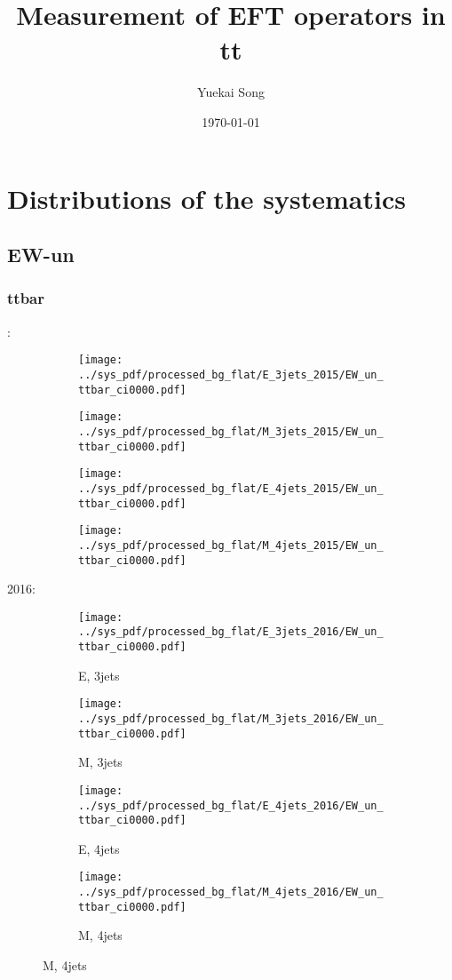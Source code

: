 \documentclass{beamer}
\title{Measurement of EFT operators in tt}
\author{Yuekai Song}
\institute{ZJU}
\date{\today}
\begin{document}
\frame{\titlepage}
\begin{frame}
    \begin{multicols}{3}
        \tableofcontents
    \end{multicols}
\end{frame}

\section{Distributions of the systematics}



\subsection{EW-un}

\begin{frame}
\frametitle{ttbar}
\fontsize{5}{1}:
\begin{figure}
\centering
\begin{subfigure}[b]{0.24\textwidth}
\texttt{[image: ../sys\_pdf/processed\_bg\_flat/E\_3jets\_2015/EW\_un\_ttbar\_ci0000.pdf]}
\end{subfigure}
\begin{subfigure}[b]{0.24\textwidth}
\texttt{[image: ../sys\_pdf/processed\_bg\_flat/M\_3jets\_2015/EW\_un\_ttbar\_ci0000.pdf]}
\end{subfigure}
\begin{subfigure}[b]{0.24\textwidth}
\texttt{[image: ../sys\_pdf/processed\_bg\_flat/E\_4jets\_2015/EW\_un\_ttbar\_ci0000.pdf]}
\end{subfigure}
\begin{subfigure}[b]{0.24\textwidth}
\texttt{[image: ../sys\_pdf/processed\_bg\_flat/M\_4jets\_2015/EW\_un\_ttbar\_ci0000.pdf]}
\end{subfigure}
\end{figure}
2016:
\begin{figure}
\centering
\begin{subfigure}[b]{0.24\textwidth}
\texttt{[image: ../sys\_pdf/processed\_bg\_flat/E\_3jets\_2016/EW\_un\_ttbar\_ci0000.pdf]}
\captionsetup{font=tiny}
\caption{E, 3jets}
\end{subfigure}
\begin{subfigure}[b]{0.24\textwidth}
\texttt{[image: ../sys\_pdf/processed\_bg\_flat/M\_3jets\_2016/EW\_un\_ttbar\_ci0000.pdf]}
\captionsetup{font=tiny}
\caption{M, 3jets}
\end{subfigure}
\begin{subfigure}[b]{0.24\textwidth}
\texttt{[image: ../sys\_pdf/processed\_bg\_flat/E\_4jets\_2016/EW\_un\_ttbar\_ci0000.pdf]}
\captionsetup{font=tiny}
\caption{E, 4jets}
\end{subfigure}
\begin{subfigure}[b]{0.24\textwidth}
\texttt{[image: ../sys\_pdf/processed\_bg\_flat/M\_4jets\_2016/EW\_un\_ttbar\_ci0000.pdf]}
\captionsetup{font=tiny}
\caption{M, 4jets}
\end{subfigure}
\end{figure}
\end{frame}
\end{document}
